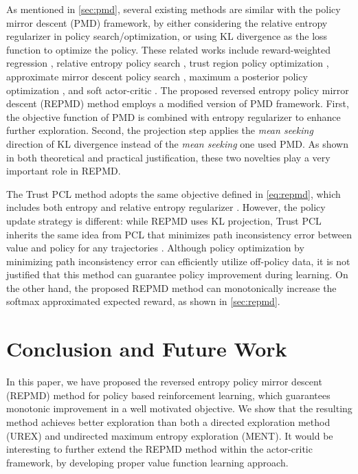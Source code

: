 \documentclass{article} %
\begin{document}
As mentioned in \cref{sec:pmd}, several existing methods are similar with the policy mirror descent (PMD) framework, by either considering the relative entropy regularizer in policy search/optimization, or using KL divergence as the loss function to optimize the policy. These related works include reward-weighted regression \citep{peters2007reinforcement,wierstra2008episodic}, relative entropy policy search \citep{peters2010relative}, trust region policy optimization \citep{schulman2015trust}, approximate mirror descent policy search \citep{montgomery2016guided}, maximum a posterior policy optimization \citep{abdolmaleki2018maximum}, and soft actor-critic \citep{haarnoja2018soft}. The proposed reversed entropy policy mirror descent (REPMD) method employs a modified version of PMD framework. First, the objective function of PMD is combined with entropy regularizer to enhance further exploration. Second, the projection step applies the \emph{mean seeking} direction of KL divergence instead of the \emph{mean seeking} one used PMD. As shown in both theoretical and practical justification, these two novelties play a very important role in REPMD. 

The Trust PCL method adopts the same objective defined in \cref{eq:repmd}, which includes both entropy and relative entropy regularizer \citep{nachum2017trust}. However, the policy update strategy is different: while REPMD uses KL projection, Trust PCL inherits the same idea from PCL that minimizes path inconsistency error between value and policy for any trajectories \citep{nachum2017bridging}. Although policy optimization by minimizing path inconsistency error can efficiently utilize off-policy data, it is not justified that this method can guarantee policy improvement during learning. On the other hand, the proposed REPMD method can monotonically increase the softmax approximated expected reward, as shown in \cref{sec:repmd}.

\section{Conclusion and Future Work}
\label{sec:conclusion_and_future_work}

In this paper, we have proposed the reversed entropy policy mirror descent (REPMD) method for policy based reinforcement learning, which guarantees monotonic improvement in a well motivated objective. We show that the resulting method achieves better exploration than both a directed exploration method (UREX) and undirected maximum entropy exploration (MENT). It would be interesting to further extend the REPMD method within the actor-critic framework, by developing proper value function learning approach. %
\end{document}
